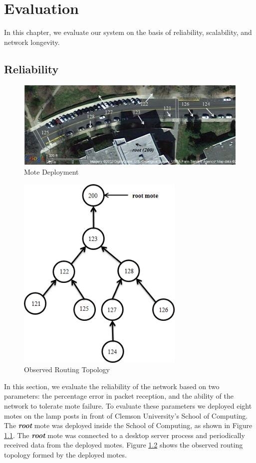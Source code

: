 \chapter{Evaluation}
In this chapter, we evaluate our system on the basis of reliability, scalability, and network longevity.

\section{Reliability}\label{sec:reliability}

\begin{figure}[htbp]
\centering
\includegraphics[width=\columnwidth]{img_deployment.png}
\caption{Mote Deployment}
\label{img_deployment}
\end{figure}

\begin{figure}[htbp]
\centering
\includegraphics[width=8cm]{network.png}
\caption{Observed Routing Topology}
\label{img_network}
\end{figure}

In this section, we evaluate the reliability of the network based on two parameters: the percentage error in packet reception, and the ability of the network to tolerate mote failure.
 To evaluate these parameters we deployed eight motes on the lamp posts in front of Clemson University's School of Computing. The \textit{\textbf{root}} mote was deployed inside the School of Computing, as shown in Figure \ref{img_deployment}. The \textit{\textbf{root}} mote was connected to a desktop server process and periodically received data from the deployed motes. Figure \ref{img_network} shows the observed routing topology formed by the deployed motes.

